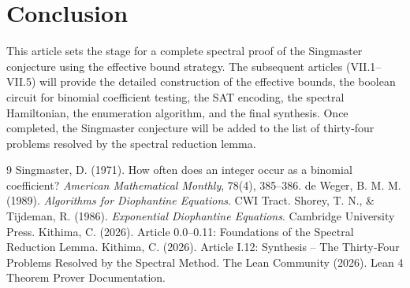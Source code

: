 \documentclass[11pt,a4paper]{article}
\begin{document}
\section{Conclusion}

This article sets the stage for a complete spectral proof of the Singmaster conjecture using the effective bound strategy. The subsequent articles (VII.1–VII.5) will provide the detailed construction of the effective bounds, the boolean circuit for binomial coefficient testing, the SAT encoding, the spectral Hamiltonian, the enumeration algorithm, and the final synthesis. Once completed, the Singmaster conjecture will be added to the list of thirty‑four problems resolved by the spectral reduction lemma.


\begin{thebibliography}{9}
  Singmaster, D. (1971). How often does an integer occur as a binomial coefficient? \emph{American Mathematical Monthly}, 78(4), 385–386.
  de Weger, B. M. M. (1989). \emph{Algorithms for Diophantine Equations}. CWI Tract.
  Shorey, T. N., \& Tijdeman, R. (1986). \emph{Exponential Diophantine Equations}. Cambridge University Press.
  Kithima, C. (2026). Article 0.0–0.11: Foundations of the Spectral Reduction Lemma.
  Kithima, C. (2026). Article I.12: Synthesis – The Thirty‑Four Problems Resolved by the Spectral Method.
  The Lean Community (2026). Lean 4 Theorem Prover Documentation.
\end{thebibliography}
\end{document}
